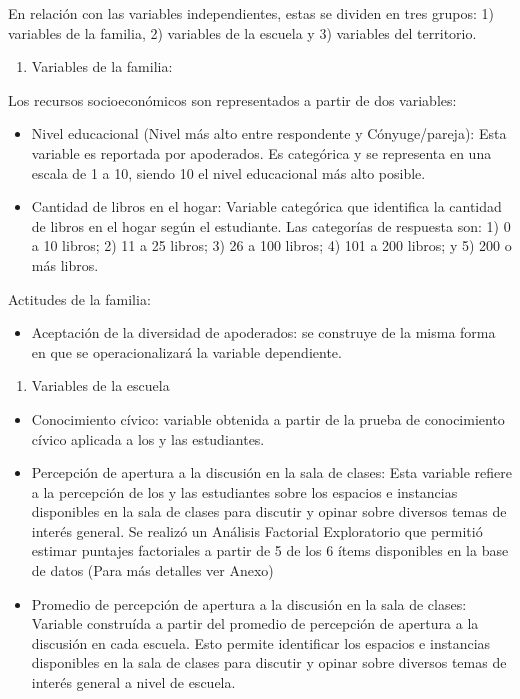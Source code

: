 \documentclass[12pt,twoside]{templates/facsothesis}
\providecommand{\tightlist}{%
  \setlength{\itemsep}{0pt}\setlength{\parskip}{0pt}}
\begin{document}
En relación con las variables independientes, estas se dividen en tres grupos: 1) variables de la familia, 2) variables de la escuela y 3) variables del territorio.

\begin{enumerate}
\def\labelenumi{\arabic{enumi})}
\tightlist
\item
  Variables de la familia:
\end{enumerate}

Los recursos socioeconómicos son representados a partir de dos variables:

\begin{itemize}
\item
  Nivel educacional (Nivel más alto entre respondente y Cónyuge/pareja): Esta variable es reportada por apoderados. Es categórica y se representa en una escala de 1 a 10, siendo 10 el nivel educacional más alto posible.
\item
  Cantidad de libros en el hogar: Variable categórica que identifica la cantidad de libros en el hogar según el estudiante. Las categorías de respuesta son: 1) 0 a 10 libros; 2) 11 a 25 libros; 3) 26 a 100 libros; 4) 101 a 200 libros; y 5) 200 o más libros.
\end{itemize}

Actitudes de la familia:

\begin{itemize}
\tightlist
\item
  Aceptación de la diversidad de apoderados: se construye de la misma forma en que se operacionalizará la variable dependiente.
\end{itemize}

\begin{enumerate}
\def\labelenumi{\arabic{enumi})}
\setcounter{enumi}{1}
\tightlist
\item
  Variables de la escuela
\end{enumerate}

\begin{itemize}
\item
  Conocimiento cívico: variable obtenida a partir de la prueba de conocimiento cívico aplicada a los y las estudiantes.
\item
  Percepción de apertura a la discusión en la sala de clases: Esta variable refiere a la percepción de los y las estudiantes sobre los espacios e instancias disponibles en la sala de clases para discutir y opinar sobre diversos temas de interés general. Se realizó un Análisis Factorial Exploratorio que permitió estimar puntajes factoriales a partir de 5 de los 6 ítems disponibles en la base de datos (Para más detalles ver Anexo)
\item
  Promedio de percepción de apertura a la discusión en la sala de clases: Variable construída a partir del promedio de percepción de apertura a la discusión en cada escuela. Esto permite identificar los espacios e instancias disponibles en la sala de clases para discutir y opinar sobre diversos temas de interés general a nivel de escuela.
\end{itemize}
\end{document}
